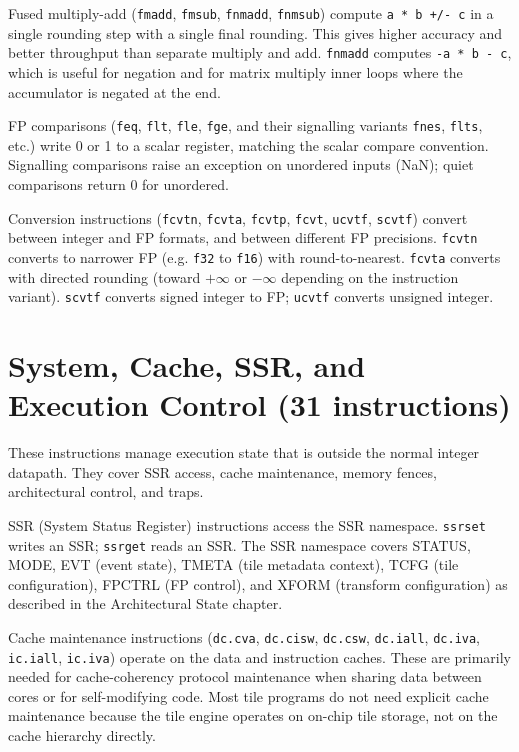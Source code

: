 Fused multiply-add (\texttt{fmadd}, \texttt{fmsub}, \texttt{fnmadd}, \texttt{fnmsub}) compute \texttt{a * b +/- c} in a single rounding step with a single final rounding. This gives higher accuracy and better throughput than separate multiply and add. \texttt{fnmadd} computes \texttt{-a * b - c}, which is useful for negation and for matrix multiply inner loops where the accumulator is negated at the end.

FP comparisons (\texttt{feq}, \texttt{flt}, \texttt{fle}, \texttt{fge}, and their signalling variants \texttt{fnes}, \texttt{flts}, etc.) write 0 or 1 to a scalar register, matching the scalar compare convention. Signalling comparisons raise an exception on unordered inputs (NaN); quiet comparisons return 0 for unordered.

Conversion instructions (\texttt{fcvtn}, \texttt{fcvta}, \texttt{fcvtp}, \texttt{fcvt}, \texttt{ucvtf}, \texttt{scvtf}) convert between integer and FP formats, and between different FP precisions. \texttt{fcvtn} converts to narrower FP (e.g. \texttt{f32} to \texttt{f16}) with round-to-nearest. \texttt{fcvta} converts with directed rounding (toward $+\infty$ or $-\infty$ depending on the instruction variant). \texttt{scvtf} converts signed integer to FP; \texttt{ucvtf} converts unsigned integer.

\section{System, Cache, SSR, and Execution Control (31 instructions)}
These instructions manage execution state that is outside the normal integer datapath. They cover SSR access, cache maintenance, memory fences, architectural control, and traps.

SSR (System Status Register) instructions access the SSR namespace. \texttt{ssrset} writes an SSR; \texttt{ssrget} reads an SSR. The SSR namespace covers STATUS, MODE, EVT (event state), TMETA (tile metadata context), TCFG (tile configuration), FPCTRL (FP control), and XFORM (transform configuration) as described in the Architectural State chapter.

Cache maintenance instructions (\texttt{dc.cva}, \texttt{dc.cisw}, \texttt{dc.csw}, \texttt{dc.iall}, \texttt{dc.iva}, \texttt{ic.iall}, \texttt{ic.iva}) operate on the data and instruction caches. These are primarily needed for cache-coherency protocol maintenance when sharing data between cores or for self-modifying code. Most tile programs do not need explicit cache maintenance because the tile engine operates on on-chip tile storage, not on the cache hierarchy directly.

